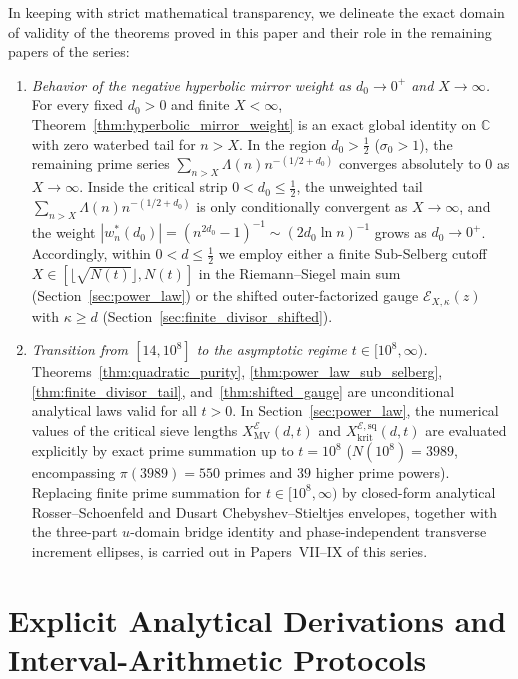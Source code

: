\documentclass[11pt,reqno]{amsart}
\theoremstyle{definition}
\theoremstyle{remark}
\numberwithin{equation}{section}
\newcommand{\C}{\mathbb{C}}
\begin{document}
In keeping with strict mathematical transparency, we delineate the exact domain of validity of the theorems proved in this paper and their role in the remaining papers of the series:
\begin{enumerate}[label=\textup{(\arabic*)},leftmargin=2.2em]
\item \textit{Behavior of the negative hyperbolic mirror weight as $d_0 \to 0^+$ and $X \to \infty$.} For every fixed $d_0 > 0$ and finite $X < \infty$, Theorem~\ref{thm:hyperbolic_mirror_weight} is an exact global identity on $\C$ with zero waterbed tail for $n > X$. In the region $d_0 > \frac{1}{2}$ ($\sigma_0 > 1$), the remaining prime series $\sum_{n > X} \Lambda(n)n^{-(1/2+d_0)}$ converges absolutely to $0$ as $X \to \infty$. Inside the critical strip $0 < d_0 \le \frac{1}{2}$, the unweighted tail $\sum_{n > X} \Lambda(n)n^{-(1/2+d_0)}$ is only conditionally convergent as $X \to \infty$, and the weight $|w_n^*(d_0)| = (n^{2d_0}-1)^{-1} \sim (2d_0\ln n)^{-1}$ grows as $d_0 \to 0^+$. Accordingly, within $0 < d \le \frac{1}{2}$ we employ either a finite Sub-Selberg cutoff $X \in [\lfloor\sqrt{N(t)}\rfloor, N(t)]$ in the Riemann--Siegel main sum (Section~\ref{sec:power_law}) or the shifted outer-factorized gauge $\mathcal{E}_{X,\kappa}(z)$ with $\kappa \ge d$ (Section~\ref{sec:finite_divisor_shifted}).
\item \textit{Transition from $[14, 10^8]$ to the asymptotic regime $t \in [10^8, \infty)$.} Theorems~\ref{thm:quadratic_purity}, \ref{thm:power_law_sub_selberg}, \ref{thm:finite_divisor_tail}, and~\ref{thm:shifted_gauge} are unconditional analytical laws valid for all $t > 0$. In Section~\ref{sec:power_law}, the numerical values of the critical sieve lengths $X_{\mathrm{MV}}^{\mathcal{E}}(d,t)$ and $X_{\mathrm{krit}}^{\mathcal{E},\mathrm{sq}}(d,t)$ are evaluated explicitly by exact prime summation up to $t = 10^8$ ($N(10^8) = 3989$, encompassing $\pi(3989) = 550$ primes and $39$ higher prime powers). Replacing finite prime summation for $t \in [10^8, \infty)$ by closed-form analytical Rosser--Schoenfeld and Dusart Chebyshev--Stieltjes envelopes, together with the three-part $u$-domain bridge identity and phase-independent transverse increment ellipses, is carried out in Papers~VII--IX of this series.
\end{enumerate}

\appendix

\section{Explicit Analytical Derivations and Interval-Arithmetic Protocols}\label{app:derivations}
\end{document}
